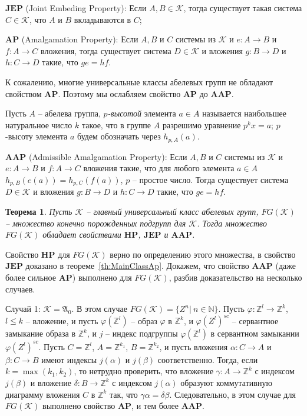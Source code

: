 \documentclass[12pt]{extarticle} %
\newtheorem{theorem}{Теорема}[section]
\def\proof{{\noindent{\bf Доказательство.}} }
\def\A{{\mathfrak{A}}}
\def\K{{\mathcal{K}}}
\def\Z{{\mathbb{Z}}}
\def\N{{\mathbb{N}}}
\def\HP{\textbf{HP}}
\def\JEP{\textbf{JEP}}
\def\AP{\textbf{AP}}
\def\AAP{\textbf{AAP}}
\begin{document}
\noindent$\JEP$ (Joint Embeding Property): Если $A, B \in \K$, тогда существует такая система $C \in \K$, что $A$ и $B$ вкладываются в $C$;

\noindent$\AP$ (Amalgamation Property): Если $A, B$ и $C$ системы из $\K$ и $e: A \rightarrow B$ и $f: A \rightarrow C$ вложения, тогда существует система $D \in \K$ и вложения $g : B \rightarrow D$ и $h : C \rightarrow D$ такие, что $ge = hf$.

К сожалению, многие универсальные классы абелевых групп не обладают свойством $\AP$. Поэтому мы ослабляем свойство $\AP$ до $\AAP$.

Пусть $A$ -- абелева группа, \textit{$p$-высотой} элемента $a \in A$ называется наибольшее натуральное число $k$ такое, что в группе $A$ разрешимо уравнение $p^k x = a$; $p$-высоту элемента $a$ будем обозначать через $h_{p,A}(a)$. 

\noindent$\AAP$ (Admissible Amalgamation Property): Если $A, B$ и $C$ системы из $\K$ и $e: A \rightarrow B$ и $f: A \rightarrow C$ вложения такие, что для любого элемента $a \in A$ $h_{p,B}(e(a)) = h_{p,C}(f(a))$, $p$ -- простое число. Тогда существует система $D \in \K$ и вложения $g : B \rightarrow D$ и $h : C \rightarrow D$ такие, что $ge = hf$.


\begin{theorem}
Пусть $\K$ -- главный универсальный класс абелевых групп, $FG(\K)$ -- множество конечно порожденных подгрупп для $\K$. Тогда множество $FG(\K)$ обладает свойствами $\HP$, $\JEP$ и $\AAP$.
\end{theorem}

\proof Свойство $\HP$ для $FG(\K)$ верно по определению этого множества, в свойство $\JEP$ доказано в теореме~\ref{th:MainClassAp}. 
Докажем, что свойство $\AAP$ (даже более сильное $\AP$) выполнено для $FG(\K)$, разбив доказательство на несколько случаев.

Случай 1: $\K = \A_0$. В этом случае $FG(\K) = \{Z^n | \ n \in \N\}$. Пусть $\varphi: \Z^l \rightarrow \Z^k$, $l \leq k$ -- вложение, и пусть $\varphi(\Z^l)$ -- образ $\varphi$ в $\Z^k$, и $\varphi(Z^l)^{sc}$ -- сервантное замыкание образа в $\Z^k$, и $j$ -- индекс подгруппы $\varphi(\Z^l)$ в сервантном замыкании $\varphi(Z^l)^{sc}$. Пусть $C = \Z^l$, $A = \Z^{k_1}$, $B = \Z^{k_2}$, и пусть вложения $\alpha: C \rightarrow A$ и $\beta: C \rightarrow B$ имеют индексы $j(\alpha)$ и $j(\beta)$ соответственно. Тогда, если $k = \max(k_1, k_2)$, то нетрудно проверить, что вложение $\gamma: A \rightarrow \Z^k$ с индексом $j(\beta)$ и вложение $\delta: B \rightarrow \Z^k$ с индексом $j(\alpha)$ образуют коммутативную диаграмму вложения $C$ в $\Z^k$ так, что $\gamma \alpha = \delta \beta$. Следовательно, в этом случае для $FG(\K)$ выполнено свойство $\AP$, и тем более $\AAP$.
\end{document}
